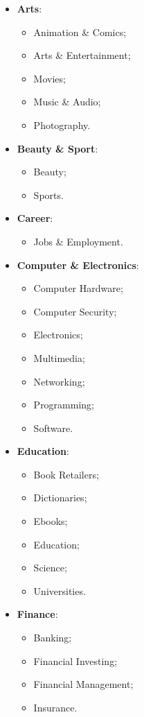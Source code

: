 \begin{itemize}
\item \textbf{Arts}:
	\begin{itemize}
	\item Animation \& Comics;
	\item Arts \& Entertainment;
	\item Movies;
	\item Music \& Audio;
	\item Photography.
	\end{itemize}
\item \textbf{Beauty \& Sport}:
	\begin{itemize}
	\item Beauty;
	\item Sports.
	\end{itemize}
\item \textbf{Career}:
	\begin{itemize}
	\item Jobs \& Employment.
	\end{itemize}
\item \textbf{Computer \& Electronics}:
	\begin{itemize}
	\item Computer Hardware;
	\item Computer Security;
	\item Electronics;
	\item Multimedia;
	\item Networking;
	\item Programming;
	\item Software.
	\end{itemize}
\item \textbf{Education}:
	\begin{itemize}
	\item Book Retailers;
	\item Dictionaries;
	\item Ebooks;
	\item Education;
	\item Science;
	\item Universities.
	\end{itemize}
\item \textbf{Finance}:
	\begin{itemize}
	\item Banking;
	\item Financial Investing;
	\item Financial Management;
	\item Insurance.

\end{itemize}
\end{itemize}
